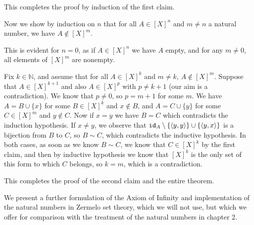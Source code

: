 \documentclass[12pt]{book}
\begin{document}
\begin{description}
This completes the proof by induction of the first claim.

Now we show by induction on $n$ that for all $A \in [X]^n$ and $m \neq n$ a natural number, we have $A \not\in [X]^m$.

This is evident for $n=0$, as if $A \in [X]^n$ we have $A$ empty, and for any $m \neq 0$, all elements of $[X]^m$ are nonempty.

Fix $k \in \mathbb N$, and assume that for all $A \in [X]^k$ and $m \neq k$, $A \not\in [X]^m$.  Suppose that $A \in [X]^{k+1}$ and also $A \in [X]^p$ with $p \neq k+1$ (our aim is a contradiction).
We know that $p \neq 0$, so $p=m+1$ for some $m$.  We have $A = B \cup \{x\}$ for some $B \in [X]^k$ and $x \not\in B$, and $A = C \cup \{y\}$ for some $C \in [X]^m$
and $y \not\in C$.  Now if $x=y$ we have $B=C$ which contradicts the induction hypothesis.  If $x \neq y$, we observe that ${\tt id}_A \setminus \{\left< y,y\right>\} \cup \{\left<y,x\right>\}$ is a bijection from $B$ to $C$, so $B \sim C$, which contradicts the inductive hypothesis.  In both cases, as soon as we know $B \sim C$, we know that $C \in [X]^k$ by the first claim, and then by inductive hypothesis we know that $[X]^k$ is the only set of this form to which $C$ belongs, so $k=m$, which is a contradiction.

This completes the proof of the second claim and the entire theorem.

\end{description}

We present a further formulation of the Axiom of Infinity and implementation of the natural numbers in Zermelo set theory, which we will not use, but which we offer for comparison with the treatment of the natural numbers in chapter 2.
\end{document}
